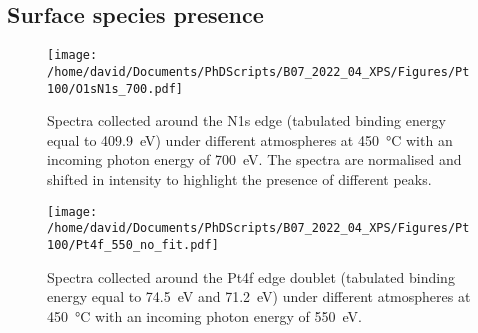\subsection{Surface species presence}

\begin{table}[!htb]
\centering
{}
\caption{}
\label{tab:XPSPt100}
\end{table}

\begin{figure}[!htb]
    \centering
    \texttt{[image: /home/david/Documents/PhDScripts/B07\_2022\_04\_XPS/Figures/Pt100/O1sN1s\_700.pdf]}
    \caption{
        Spectra collected around the N1s edge (tabulated binding energy equal to \qty{409.9}{\eV}) under different atmospheres at \qty{450}{\degreeCelsius} with an incoming photon energy of \qty{700}{\eV}.
        The spectra are normalised and shifted in intensity to highlight the presence of different peaks.
    }
    \label{fig:O1sN1sPt100}
\end{figure}

\begin{figure}[!htb]
    \centering
    \texttt{[image: /home/david/Documents/PhDScripts/B07\_2022\_04\_XPS/Figures/Pt100/Pt4f\_550\_no\_fit.pdf]}
    \caption{
    	Spectra collected around the Pt4f edge doublet (tabulated binding energy equal to \qty{74.5}{\eV} and \qty{71.2}{\eV}) under different atmospheres at \qty{450}{\degreeCelsius} with an incoming photon energy of \qty{550}{\eV}.
    }
    \label{fig:Pt4fPt100}
\end{figure}

